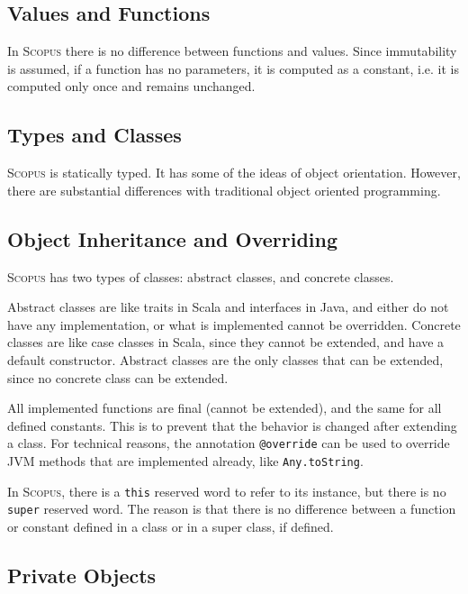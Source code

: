 \documentclass[12pt,a4paper]{article}
\makeatletter
\newcommand{\srccode}[1]{\texttt{{#1}}}
\newcommand{\reservedWord}[1]{{\color{blue}\srccode{#1}}\xspace}
\newcommand{\annotation}[1]{{\color{brown}\srccode{#1}}\xspace}
\newcommand{\sthis}{\reservedWord{this}}
\newcommand{\soverride}{\annotation{@override}}
\newcommand{\Scopus}{\textsc{Scopus}\xspace}
\makeatother
\begin{document}
    \subsection{Values and Functions}

    In \Scopus there is no difference between functions and values.
    Since immutability is assumed, if a function has no parameters, it is computed as a constant, i.e. it is computed only once and remains unchanged.

    \subsection{Types and Classes}

    \Scopus is statically typed.
    It has some of the ideas of object orientation.
    However, there are substantial differences with traditional object oriented programming.

    \subsection{Object Inheritance and Overriding}

    \Scopus has two types of classes: abstract classes, and concrete classes.

    Abstract classes are like traits in Scala and interfaces in Java, and either do not have any implementation, or what is implemented cannot be overridden.
    Concrete classes are like case classes in Scala, since they cannot be extended, and have a default constructor.
    Abstract classes are the only classes that can be extended, since no concrete class can be extended.

    All implemented functions are final (cannot be extended), and the same for all defined constants.
    This is to prevent that the behavior is changed after extending a class.
    For technical reasons, the annotation \soverride can be used to override JVM methods that are implemented already, like \srccode{Any.toString}.

    In \Scopus, there is a \sthis reserved word to refer to its instance, but there is no \srccode{super} reserved word.
    The reason is that there is no difference between a function or constant defined in a class or in a super class, if defined.

    \subsection{Private Objects}
\end{document}

